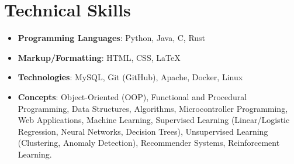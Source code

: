 \section{Technical Skills}
{\small
\begin{itemize}
    \item \textbf{Programming Languages}: Python, Java, C, Rust
    \item \textbf{Markup/Formatting}: HTML, CSS, \LaTeX
    \item \textbf{Technologies}: MySQL, Git (GitHub), Apache, Docker, Linux
    \item \textbf{Concepts}: Object-Oriented (OOP), Functional and Procedural Programming, Data Structures, Algorithms, Microcontroller Programming, Web Applications, Machine Learning, Supervised Learning (Linear/Logistic Regression, Neural Networks, Decision Trees), Unsupervised Learning (Clustering, Anomaly Detection), Recommender Systems, Reinforcement Learning.
\end{itemize}
}